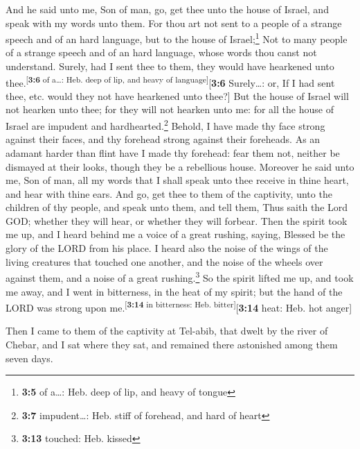  And he said unto me, Son of man, go, get thee unto the
house of Israel, and speak with my words unto them.  For
thou art not sent to a people of a strange speech and of an hard
language, but to the house of Israel;\footnote{\textbf{3:5} of a\ldots:
  Heb. deep of lip, and heavy of tongue}  Not to many
people of a strange speech and of an hard language, whose words thou
canst not understand. Surely, had I sent thee to them, they would have
hearkened unto thee.\textsuperscript{{[}\textbf{3:6} of a\ldots: Heb.
deep of lip, and heavy of language{]}}{[}\textbf{3:6} Surely\ldots: or,
If I had sent thee, etc. would they not have hearkened unto thee?{]}
 But the house of Israel will not hearken unto thee; for
they will not hearken unto me: for all the house of Israel are impudent
and hardhearted.\footnote{\textbf{3:7} impudent\ldots: Heb. stiff of
  forehead, and hard of heart}  Behold, I have made thy
face strong against their faces, and thy forehead strong against their
foreheads.  As an adamant harder than flint have I made
thy forehead: fear them not, neither be dismayed at their looks, though
they be a rebellious house.  Moreover he said unto me,
Son of man, all my words that I shall speak unto thee receive in thine
heart, and hear with thine ears.  And go, get thee to
them of the captivity, unto the children of thy people, and speak unto
them, and tell them, Thus saith the Lord GOD; whether they will hear, or
whether they will forbear.  Then the spirit took me up,
and I heard behind me a voice of a great rushing, saying, Blessed be the
glory of the LORD from his place.  I heard also the noise
of the wings of the living creatures that touched one another, and the
noise of the wheels over against them, and a noise of a great
rushing.\footnote{\textbf{3:13} touched: Heb. kissed}  So
the spirit lifted me up, and took me away, and I went in bitterness, in
the heat of my spirit; but the hand of the LORD was strong upon
me.\textsuperscript{{[}\textbf{3:14} in bitterness: Heb.
bitter{]}}{[}\textbf{3:14} heat: Heb. hot anger{]}

 Then I came to them of the captivity at Tel-abib, that
dwelt by the river of Chebar, and I sat where they sat, and remained
there astonished among them seven days.

